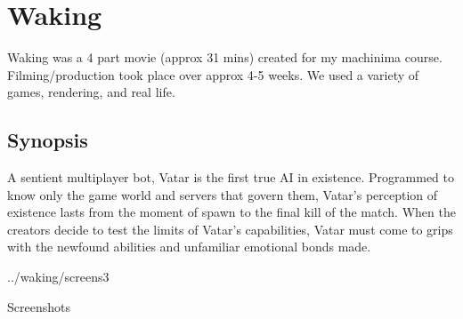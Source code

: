 \section{Waking}
\label{works:waking}

Waking was a 4 part movie (approx 31 mins) created for my machinima
course. Filming/production took place over approx 4-5 weeks. We used a
variety of games, rendering, and real life.

\subsection*{Synopsis}
A sentient multiplayer bot, Vatar is the first true AI in existence.
Programmed to know only the game world and servers that govern them,
Vatar's perception of existence lasts from the moment of spawn to the
final kill of the match. When the creators decide to test the limits
of Vatar's capabilities, Vatar must come to grips with the newfound
abilities and unfamiliar emotional bonds made.

\begin{images}{../waking/screens}{3}{\textwidth}
    \caption{Screenshots}
    \centering
\end{images}
